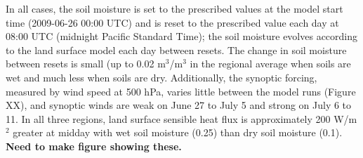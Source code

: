 In all cases, the soil moisture is set to the prescribed values at the model start time (2009-06-26 00:00 UTC) and is reset to the prescribed value each day at 08:00 UTC (midnight Pacific Standard Time); the soil moisture evolves according to the land surface model each day between resets.  The change in soil moisture between resets is small (up to 0.02 m$^3$/m$^3$ in the regional average when soils are wet and much less when soils are dry.  Additionally, the synoptic forcing, measured by wind speed at 500 hPa, varies little between the model runs (Figure XX), and synoptic winds are weak on June 27 to July 5 and strong on July 6 to 11.  In all three regions, land surface sensible heat flux is approximately 200 W/m$^2$ greater at midday with wet soil moisture (0.25) than dry soil moisture (0.1).  \textbf{Need to make figure showing these.}


